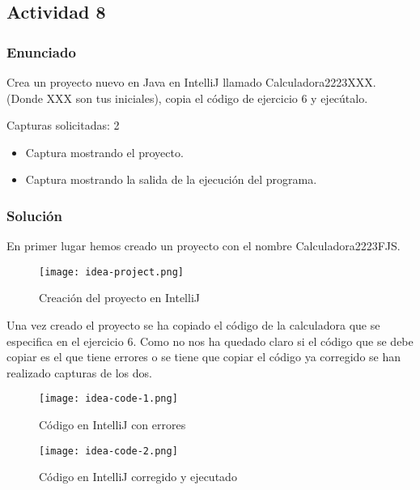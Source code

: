 \subsection{Actividad 8}
\subsubsection{Enunciado}
Crea un proyecto nuevo en Java en IntelliJ llamado Calculadora2223XXX. (Donde XXX son tus iniciales), copia el código de ejercicio 6 y ejecútalo.

Capturas solicitadas: 2
\begin{itemize}
    \item Captura mostrando el proyecto.
    \item Captura mostrando la salida de la ejecución del programa.
\end{itemize}

\subsubsection{Solución}

En primer lugar hemos creado un proyecto con el nombre Calculadora2223FJS.

\begin{figure}[ht]
    \centering
    \texttt{[image: idea-project.png]}
    \caption{Creación del proyecto en IntelliJ}
\end{figure}

Una vez creado el proyecto se ha copiado el código de la calculadora que se especifica en el ejercicio 6. Como no nos ha quedado claro si el código que se debe copiar es el que tiene errores o se tiene que copiar el código ya corregido se han realizado capturas de los dos.

\begin{figure}[ht]
    \centering
    \texttt{[image: idea-code-1.png]}
    \caption{Código en IntelliJ con errores}
\end{figure}

\begin{figure}[ht]
    \centering
    \texttt{[image: idea-code-2.png]}
    \caption{Código en IntelliJ corregido y ejecutado}
\end{figure}


\newpage



